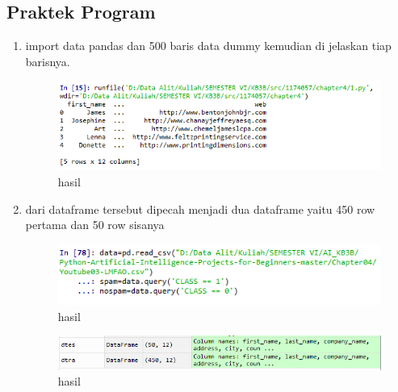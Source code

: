 \subsection{Praktek Program}
\begin{enumerate}
\item import data pandas dan 500 baris data dummy kemudian di jelaskan tiap barisnya.

\begin{figure}[H]
\centering
\includegraphics[scale=0.7]{figures/1174057/chapter4/6.PNG}
\caption{hasil}
\label{Praktek no 1}
\end{figure}		

\item dari dataframe tersebut dipecah menjadi dua dataframe yaitu 450 row pertama dan 50 row sisanya

\begin{figure}[H]
\centering
\includegraphics[scale=0.7]{figures/1174057/chapter4/7_1.PNG}
\caption{hasil}
\label{Praktek}
\end{figure}

\begin{figure}[H]
\centering
\includegraphics[scale=0.7]{figures/1174057/chapter4/7.PNG}
\caption{hasil}
\label{Praktek no 2}
\end{figure}		


\end{enumerate}
